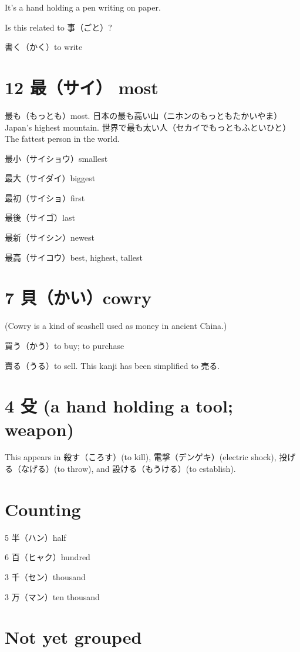 It's a hand holding a pen writing on paper.

Is this related to 事（ごと）?

書く（かく）to write

\section{12 最（サイ） most}

最も（もっとも）most.
日本の最も高い山（ニホンのもっともたかいやま）Japan's highest mountain.
世界で最も太い人（セカイでもっともふといひと）The fattest person in the world.

最小（サイショウ）smallest

最大（サイダイ）biggest

最初（サイショ）first

最後（サイゴ）last

最新（サイシン）newest

最高（サイコウ）best, highest, tallest

\section{7 貝（かい）cowry}

(Cowry is a kind of seashell used as money in ancient China.)

買う（かう）to buy; to purchase

賣る（うる）to sell.
This kanji has been simplified to 売る.

\section{4 殳 (a hand holding a tool; weapon)}

This appears in
殺す（ころす）(to kill),
電撃（デンゲキ）(electric shock),
投げる（なげる）(to throw),
and 設ける（もうける）(to establish).

\section{Counting}

5 半（ハン）half

6 百（ヒャク）hundred

3 千（セン）thousand

3 万（マン）ten thousand

\section{Not yet grouped}

